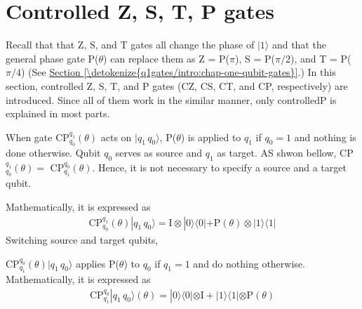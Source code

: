 \documentclass[letterpaper,10pt,english]{jupyterBook}
\begin{document}
\sphinxstepscope


\section{Controlled\sphinxhyphen{} Z, S, T, P gates}
\label{\detokenize{q2gates/cp:controlled-z-s-t-p-gates}}\label{\detokenize{q2gates/cp:sec-cpgate}}\label{\detokenize{q2gates/cp::doc}}
\sphinxAtStartPar
Recall that that Z, S, and T gates all change the phase of \(|1\rangle\) and that the general phase gate P(\(\theta\)) can replace them as Z = P(\(\pi\)), S = P(\(\pi/2\)), and T = P(\(\pi/4\))  (See \hyperref[\detokenize{q1gates/intro:chap-one-qubit-gates}]{Section \ref{\detokenize{q1gates/intro:chap-one-qubit-gates}}}.)  In this section, controlled\sphinxhyphen{} Z, S, T, and P gates (CZ, CS, CT, and CP, respectively) are introduced.  Since all of them work in the similar manner, only controlled\sphinxhyphen{}P is explained in most parts.

\sphinxAtStartPar
{}

\sphinxAtStartPar
When gate  CP\(_{q_0}^{q_1}(\theta)\) acts on \(|q_1\, q_0\rangle\), P(\(\theta\)) is applied to \(q_1\) if \(q_0=1\) and nothing is done otherwise. Qubit \(q_0\) serves as source and \(q_1\) as target.  AS shwon bellow, CP\(_{q_0}^{q_1}(\theta) =\) CP\(_{q_1}^{q_0}(\theta)\).  Hence, it is not necessary to specify a source and a target qubit.

\sphinxAtStartPar
Mathematically, it is expressed as
\begin{equation*}
\begin{split}
\text{CP}_{q_0}^{q_1}(\theta)|q_1\, q_0\rangle = \text{I} \otimes |0\rangle\langle 0| + \text{P}(\theta) \otimes |1\rangle\langle 1|
\end{split}
\end{equation*}
\sphinxAtStartPar
Switching source and target qubits,

\sphinxAtStartPar
CP\(_{q_1}^{q_0} (\theta) |q_1\, q_0\rangle\)  applies P(\(\theta\)) to \(q_0\) if \(q_1=1\) and do nothing otherwise.  Mathematically, it is expressed as
\begin{equation*}
\begin{split}
\text{CP}_{q_1}^{q_0}|q_1\, q_0\rangle (\theta) = |0\rangle\langle 0| \otimes \text{I}   +   |1\rangle\langle 1| \otimes \text{P}(\theta)
\end{split}
\end{equation*}
\sphinxAtStartPar
{}
\end{document}
